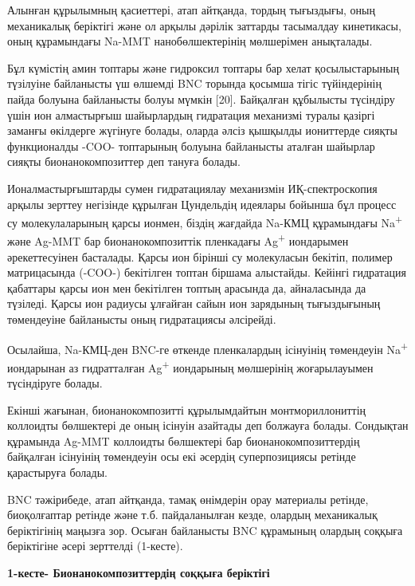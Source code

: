 \begin{multicols}{2}
Алынған құрылымның қасиеттері, атап айтқанда, тордың тығыздығы, оның
механикалық беріктігі және ол арқылы дәрілік заттарды тасымалдау
кинетикасы, оның құрамындағы Na-MMT нанобөлшектерінің мөлшерімен
анықталады.

Бұл күмістің амин топтары және гидроксил топтары бар хелат
қосылыстарының түзілуіне байланысты үш өлшемді BNC торында қосымша тігіс
түйіндерінің пайда болуына байланысты болуы мүмкін {[}20{]}. Байқалған
құбылысты түсіндіру үшін ион алмастырғыш шайырлардың гидратация
механизмі туралы қазіргі заманғы өкілдерге жүгінуге болады, оларда әлсіз
қышқылды иониттерде сияқты функционалды -COO- топтарының болуына
байланысты аталған шайырлар сияқты бионанокомпозиттер деп тануға болады.

Ионалмастырғыштарды сумен гидратациялау механизмін ИҚ-спектроскопия
арқылы зерттеу негізінде құрылған Цундельдің идеялары бойынша бұл
процесс су молекулаларының қарсы ионмен, біздің жағдайда Na-КМЦ
құрамындағы Na\textsuperscript{+} және Ag-MMT бар бионанокомпозиттік
пленкадағы Ag\textsuperscript{+} иондарымен әрекеттесуінен басталады.
Қарсы ион бірінші су молекуласын бекітіп, полимер матрицасында (-COO-)
бекітілген топтан біршама алыстайды. Кейінгі гидратация қабаттары қарсы
ион мен бекітілген топтың арасында да, айналасында да түзіледі. Қарсы
ион радиусы ұлғайған сайын ион зарядының тығыздығының төмендеуіне
байланысты оның гидратациясы әлсірейді.

Осылайша, Na-КМЦ-ден BNC-ге өткенде пленкалардың ісінуінің төмендеуін
Na\textsuperscript{+} иондарынан аз гидратталған Ag\textsuperscript{+}
иондарының мөлшерінің жоғарылауымен түсіндіруге болады.

Екінші жағынан, бионанокомпозитті құрылымдайтын монтмориллониттің
коллоидты бөлшектері де оның ісінуін азайтады деп болжауға болады.
Сондықтан құрамында Ag-MMT коллоидты бөлшектері бар
бионанокомпозиттердің байқалған ісінуінің төмендеуін осы екі әсердің
суперпозициясы ретінде қарастыруға болады.

BNC тәжірибеде, атап айтқанда, тамақ өнімдерін орау материалы ретінде,
биоқолғаптар ретінде және т.б. пайдаланылған кезде, олардың механикалық
беріктігінің маңызға зор. Осыған байланысты BNC құрамының олардың
соққыға беріктігіне әсері зерттелді (1-кесте).
\end{multicols}

{\bfseries 1-кесте- Бионанокомпозиттердің соққыға беріктігі}

